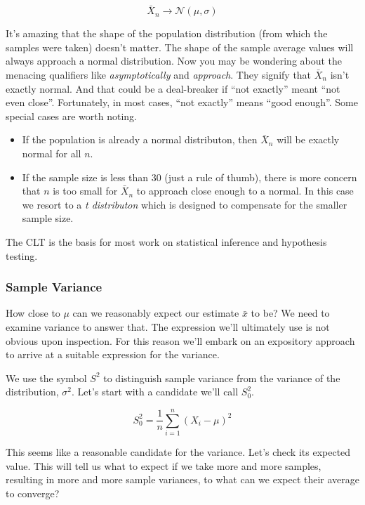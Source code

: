 \documentclass[]{article}
\begin{document}
$$
\bar{X}_n \rightarrow \mathcal{N}(\mu, \sigma)
$$

It's amazing that the shape of the population distribution
(from which the samples were taken) doesn't matter.  The shape
of the sample average values will always approach
a normal distribution.  Now you may be wondering about the
menacing qualifiers like \emph{asymptotically} and
\emph{approach}.  They signify that $\bar{X}_n$ isn't exactly
normal.  And that could be a deal-breaker if ``not exactly''
meant ``not even close''.  Fortunately, in most cases,
``not exactly'' means ``good enough''.  Some special cases
are worth noting.

\begin{itemize}

\item If the population is already a normal distributon,
then $\bar{X}_n$ will be exactly normal for all $n$.

\item If the sample size is less than 30 (just a rule of
thumb), there is more concern that $n$ is too small
for $\bar{X}_n$ to approach close enough to a normal.  In
this case we resort to a \emph{t distributon} which is
designed to compensate for the smaller sample size.
\end{itemize}

The CLT is the basis for most work on statistical inference
and hypothesis testing.


\subsubsection{Sample Variance}


How close to $\mu$ can we reasonably expect our estimate $\bar{x}$ to be?
We need to examine variance to answer that.  The expression we'll ultimately
use is not obvious upon inspection.  For this reason we'll
embark on an expository approach to arrive at a suitable expression
for the variance.

We use the symbol $S^2$ to distinguish sample variance from the
variance of the distribution, $\sigma^2$.  Let's start with a
candidate we'll call $S_0^2$.

\begin{equation} \label{s0}
S_0^2 = \frac{1}{n} \sum_{i=1}^n (X_i - \mu)^2
\end{equation}

This seems like a reasonable candidate for the variance.  Let's
check its expected value.  This will tell us what to expect if
we take more and more samples, resulting in more and more sample
variances, to what can we expect their average to converge?
\end{document}
